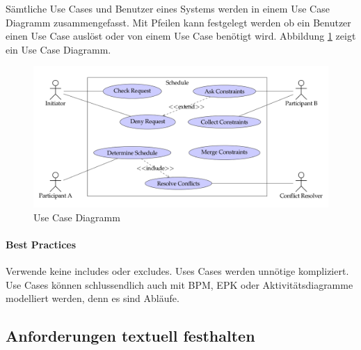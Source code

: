 Sämtliche Use Cases und Benutzer eines Systems werden in einem Use Case Diagramm zusammengefasst. Mit Pfeilen kann festgelegt werden ob ein Benutzer einen Use Case auslöst oder von einem Use Case benötigt wird. Abbildung \ref{fig:use-case-diagramm} zeigt ein Use Case Diagramm.
\begin{figure}
\centering
\includegraphics[width=\linewidth]{fig/use-case-diagramm}
\caption{Use Case Diagramm}
\label{fig:use-case-diagramm}
\end{figure}

\paragraph{Best Practices} Verwende keine includes oder excludes. Uses Cases werden unnötige kompliziert. Use Cases können schlussendlich auch mit BPM, EPK oder Aktivitätsdiagramme modelliert werden, denn es sind Abläufe.

\subsection{Anforderungen textuell festhalten}


